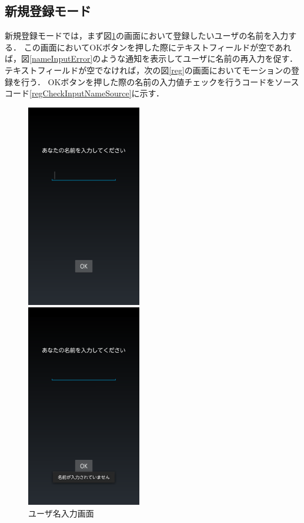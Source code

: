 \documentclass[11pt]{jreport}
\begin{document}
\newpage
        \subsection{新規登録モード}
        新規登録モードでは，まず図\ref{nameInput}の画面において登録したいユーザの名前を入力する．
        この画面においてOKボタンを押した際にテキストフィールドが空であれば，図\ref{nameInputError}のような通知を表示してユーザに名前の再入力を促す．
        テキストフィールドが空でなければ，次の図\ref{reg}の画面においてモーションの登録を行う．
        OKボタンを押した際の名前の入力値チェックを行うコードをソースコード\ref{regCheckInputNameSource}に示す．

        \begin{figure}[tbhp]
            \begin{minipage}{0.33\hsize}
                \begin{center}
                    \includegraphics[width=5cm, bb=0 0 540 960]{NameInput.pdf}
                \end{center}
                \caption{ユーザ名入力画面}
                \label{nameInput}
            \end{minipage}
            \begin{minipage}{0.33\hsize}
                \begin{center}
                    \includegraphics[width=5cm, bb=0 0 540 960]{NameInputError.pdf}

\end{center}
\end{minipage}
\end{figure}
\end{document}
